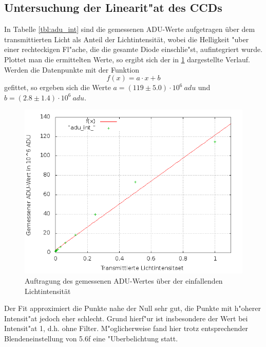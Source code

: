 \subsection{Untersuchung der Linearit"at des CCDs}
In Tabelle \ref{tbl:adu_int} sind die gemessenen ADU-Werte aufgetragen über dem transmittierten Licht als Anteil der Lichtintensität, wobei die Helligkeit "uber einer rechteckigen Fl"ache, die die gesamte Diode einschlie"st, aufintegriert wurde. \\
Plottet man die ermittelten Werte, so ergibt sich der in \ref{plot:adu_int} dargestellte Verlauf. Werden die Datenpunkte mit der Funktion 
\begin{equation}
f(x) = a \cdot x + b
\end{equation}
gefittet, so ergeben sich die Werte $a = (119 \pm 5.0) \cdot 10^6 \ adu$ und $b = (2.8 \pm 1.4) \cdot 10^6 \ adu$.
\begin{figure}[h!]
\centering
        \includegraphics[width=.9\textwidth]{adu_int_.png}
\caption{ Auftragung des gemessenen ADU-Wertes über der einfallenden Lichtintensität }
\label{plot:adu_int}
\end{figure}
Der Fit approximiert die Punkte nahe der Null sehr gut, die Punkte mit h"oherer Intensit"at jedoch eher schlecht. Grund hierf"ur ist insbesondere der Wert bei Intensit"at 1, d.h. ohne Filter. M"oglicherweise fand hier trotz entsprechender Blendeneinstellung von 5.6f eine "Uberbelichtung statt.\\
